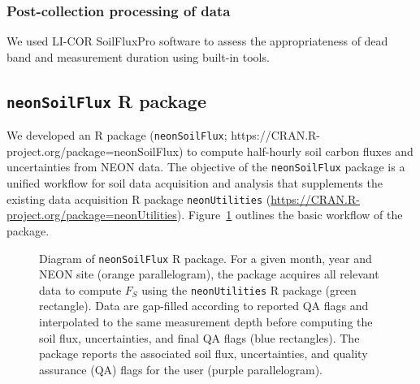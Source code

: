 \documentclass[
  letterpaper,
  DIV=11,
  numbers=noendperiod]{scrartcl}
\begin{document}
\normalsize

\subsubsection{Post-collection processing of
data}\label{post-collection-processing-of-data}

We used LI-COR SoilFluxPro software to assess the appropriateness of
dead band and measurement duration using built-in tools.

\subsection{\texorpdfstring{\texttt{neonSoilFlux} R
package}{neonSoilFlux R package}}\label{neonsoilflux-r-package}

We developed an R package (\texttt{neonSoilFlux};
https://CRAN.R-project.org/package=neonSoilFlux) to compute half-hourly
soil carbon fluxes and uncertainties from NEON data. The objective of
the \texttt{neonSoilFlux} package is a unified workflow for soil data
acquisition and analysis that supplements the existing data acquisition
R package \texttt{neonUtilities}
(\url{https://CRAN.R-project.org/package=neonUtilities}).
Figure~\ref{fig-package-diagram} outlines the basic workflow of the
package.

\begin{figure}


\caption{\label{fig-package-diagram}Diagram of \texttt{neonSoilFlux} R
package. For a given month, year and NEON site (orange parallelogram),
the package acquires all relevant data to compute \(F_{S}\) using the
\texttt{neonUtilities} R package (green rectangle). Data are gap-filled
according to reported QA flags and interpolated to the same measurement
depth before computing the soil flux, uncertainties, and final QA flags
(blue rectangles). The package reports the associated soil flux,
uncertainties, and quality assurance (QA) flags for the user (purple
parallelogram).}

\end{figure}%
\end{document}
